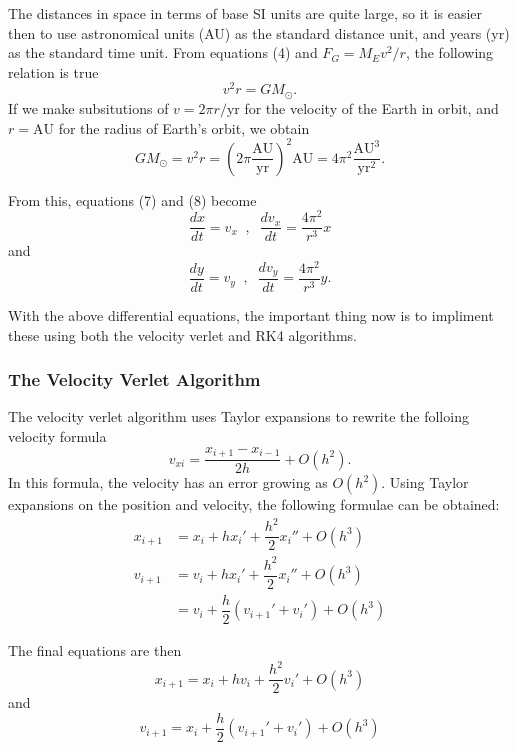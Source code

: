 \documentclass[11pt]{article}
\begin{document}
    The distances in space in terms of base SI units are quite large, so it is easier then to use astronomical units (AU) as the standard distance unit, and years (yr) as the standard time unit. From equations (4) and $F_G = M_Ev^2/r$, the following relation is true
    \begin{equation}  v^2r=GM_\odot . \end{equation}
    If we make subsitutions of $v=2\pi r/\text{yr}$ for the velocity of the Earth in orbit, and $r=\text{AU}$ for the radius of Earth's orbit, we obtain
    \begin{equation} GM_\odot = v^2r = \left( 2\pi \dfrac{\text{AU}}{\text{yr}} \right)^2 \text{AU} = 4\pi^2 \dfrac{\text{AU}^3}{\text{yr}^2} . \end{equation}

    From this, equations (7) and (8) become
    \begin{equation} \dfrac{dx}{dt} = v_x \;\; , \;\; \dfrac{dv_x}{dt} = \dfrac{4\pi^2}{r^3}x \end{equation}
    and
    \begin{equation} \dfrac{dy}{dt} = v_y \;\; , \;\; \dfrac{dv_y}{dt} = \dfrac{4\pi^2}{r^3}y . \end{equation}

    With the above differential equations, the important thing now is to impliment these using both the velocity verlet and RK4 algorithms.

\subsubsection{The Velocity Verlet Algorithm}

    The velocity verlet algorithm uses Taylor expansions to rewrite the folloing velocity formula
    \begin{equation} v_{xi} = \dfrac{x_{i+1}-x_{i-1}}{2h} + O(h^2) . \end{equation} 
    In this formula, the velocity has an error growing as $O(h^2)$. Using Taylor expansions on the position and velocity, the following formulae can be obtained:
    \begin{align*} x_{i+1} &= x_i + hx_i' +\dfrac{h^2}{2}x_i'' + O(h^3) \\ v_{i+1} &= v_i + hx_i' +\dfrac{h^2}{2}x_i'' + O(h^3) \\ &= v_i + \dfrac{h}{2}(v_{i+1}' + v_i') + O(h^3) \end{align*}

    The final equations are then
    \begin{equation} x_{i+1} = x_i + hv_i + \dfrac{h^2}{2}v_i' + O(h^3) \end{equation}
    and
    \begin{equation} v_{i+1} = x_i + \dfrac{h}{2}(v_{i+1}' + v_i') + O(h^3) \end{equation}
\end{document}
